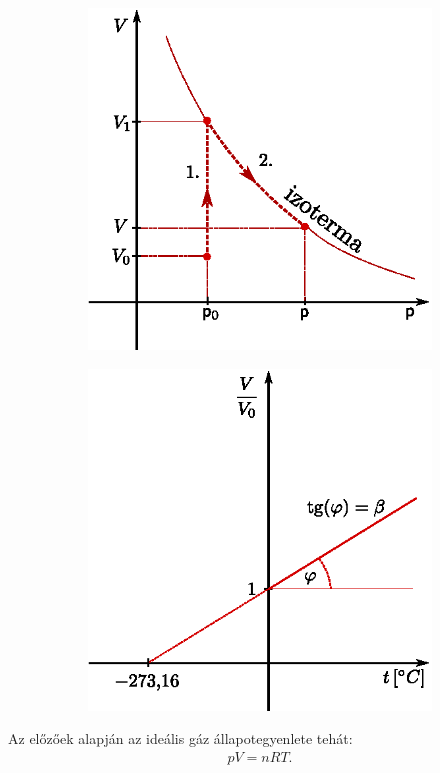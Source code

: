 \begin{figure}[!h]
    \centering
    \begin{subfigure}[t]{0.45\textwidth}
            \centering
            \includegraphics[width=\textwidth]{termo_1/termo_1_2}
            \label{fig:termo_1_2}
    \end{subfigure}\hfill
    \begin{subfigure}[t]{0.45\textwidth}
            \centering
            \includegraphics[width=\textwidth]{termo_1/termo_1_3}
            \label{fig:termo_1_3}
    \end{subfigure}
    \end{figure}
Az előzőek alapján az ideális gáz állapotegyenlete tehát:
\begin{align}
    pV = nRT.
\end{align}